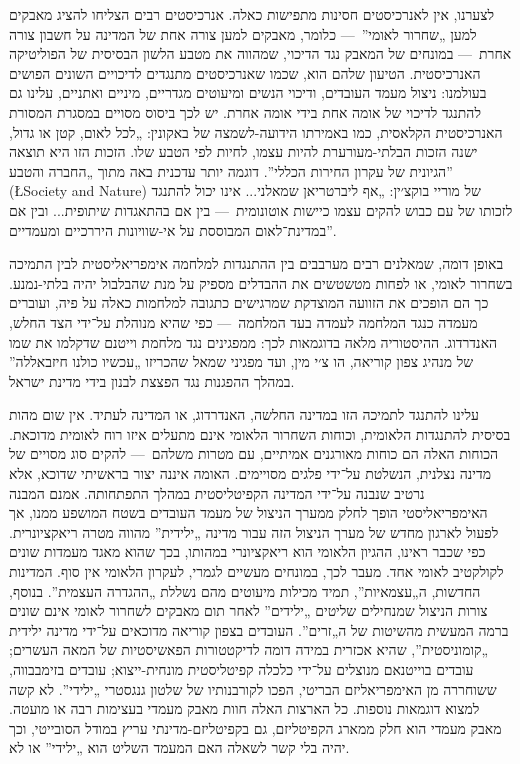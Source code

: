 לצערנו, אין לאנרכיסטים חסינות מתפישות כאלה. אנרכיסטים רבים הצליחו להציג מאבקים למען „שחרור לאומי”~— כלומר, מאבקים למען צורה אחת של המדינה על חשבון צורה אחרת~— במונחים של המאבק נגד הדיכוי, שמהווה את מטבע הלשון הבסיסית של הפוליטיקה האנרכיסטית. הטיעון שלהם הוא, שכמו שאנרכיסטים מתנגדים לדיכויים השונים הפושים בעולמנו: ניצול מעמד העובדים, ודיכוי הנשים ומיעוטים מגדריים, מיניים ואתניים, עלינו גם להתנגד לדיכוי של אומה אחת בידי אומה אחרת. יש לכך ביסוס מסויים במסגרת המסורת האנרכיסטית הקלאסית, כמו באמירתו הידועה-לשמצה של באקונין: „לכל לאום, קטן או גדול, ישנה הזכות הבלתי-מעורערת להיות עצמו, לחיות לפי הטבע שלו. הזכות הזו היא תוצאה הגיונית של עקרון החירות הכללי”. דוגמה יותר עדכנית באה מתוך „החברה והטבע” (\L{Society and Nature}) של מוריי בוקצ׳ין: „אף ליברטריאן שמאלני... אינו יכול להתנגד לזכותו של עם כבוש להקים עצמו כיישות אוטונומית~— בין אם בהתאגדות שיתופית... ובין אם במדינת־לאום המבוססת על אי-שוויונות היררכיים ומעמדיים”.

באופן דומה, שמאלנים רבים מערבבים בין ההתנגדות למלחמה אימפריאליסטית לבין התמיכה בשחרור לאומי, או לפחות מטשטשים את ההבדלים מספיק על מנת שהבלבול יהיה בלתי-נמנע. כך הם הופכים את הזוועה המוצדקת שמרגישים כתגובה למלחמות כאלה על פיה, ועוברים מעמדה כנגד המלחמה לעמדה בעד המלחמה~— כפי שהיא מנוהלת על־ידי הצד החלש, האנדרדוג. ההיסטוריה מלאה בדוגמאות לכך: ממפגינים נגד מלחמת וייטנם שדקלמו את שמו של מנהיג צפון קוריאה, הו צ׳י מין, ועד מפגיני שמאל שהכריזו „עכשיו כולנו חיזבאללה” במהלך ההפגנות נגד הפצצת לבנון בידי מדינת ישראל.

עלינו להתנגד לתמיכה הזו במדינה החלשה, האנדרדוג, או המדינה לעתיד. אין שום מהות בסיסית להתנגדות הלאומית, וכוחות השחרור הלאומי אינם מתעלים איזו רוח לאומית מדוכאת. הכוחות האלה הם כוחות מאורגנים אמיתיים, עם מטרות משלהם~— להקים סוג מסויים של מדינה נצלנית, הנשלטת על־ידי פלגים מסויימים. האומה איננה יצור בראשיתי שדוכא, אלא נרטיב שנבנה על־ידי המדינה הקפיטליסטית במהלך התפתחותה. אמנם המבנה האימפריאליסטי הופך לחלק ממערך הניצול של מעמד העובדים בשטח המושפע ממנו, אך לפעול לארגון מחדש של מערך הניצול הזה עבור מדינה „ילידית” מהווה מטרה ריאקציונרית. כפי שכבר ראינו, ההגיון הלאומי הוא ריאקציונרי במהותו, בכך שהוא מאגד מעמדות שונים לקולקטיב לאומי אחד. מעבר לכך, במונחים מעשיים לגמרי, לעקרון הלאומי אין סוף. המדינות החדשות, ה„עצמאיות”, תמיד מכילות מיעוטים מהם נשללת „ההגדרה העצמית”. בנוסף, צורות הניצול שמנחילים שליטים „ילידים” לאחר תום מאבקים לשחרור לאומי אינם שונים ברמה המעשית מהשיטות של ה„זרים”. העובדים בצפון קוריאה מדוכאים על־ידי מדינה ילידית „קומוניסטית”, שהיא אכזרית במידה דומה לדיקטטורות הפאשיסטיות של המאה העשרים; עובדים בוייטנאם מנוצלים על־ידי כלכלה קפיטליסטית מונחית-ייצוא; עובדים בזימבבווה, ששוחררה מן האימפריאליזם הבריטי, הפכו לקורבנותיו של שלטון גנגסטרי „ילידי”. לא קשה למצוא דוגמאות נוספות. כל הארצות האלה חוות מאבק מעמדי בעצימות רבה או מועטה. מאבק מעמדי הוא חלק ממארג הקפיטליזם, גם בקפיטליזם-מדינתי עריץ במודל הסובייטי, וכך יהיה בלי קשר לשאלה האם המעמד השליט הוא „ילידי” או לא.

